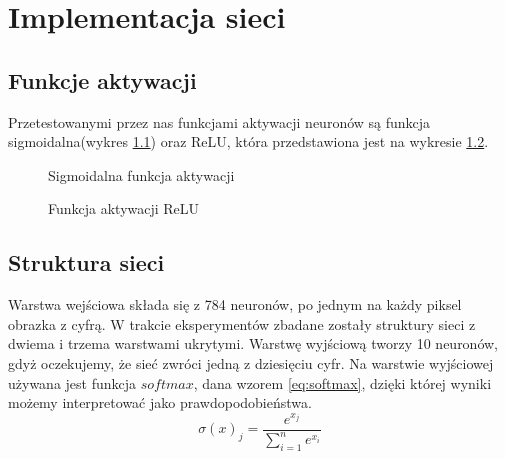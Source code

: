 {\let\clearpage\relax \chapter{Implementacja sieci}}
\section{Funkcje aktywacji}
Przetestowanymi przez nas funkcjami aktywacji neuronów są funkcja sigmoidalna(wykres \ref{fig:sig}) oraz ReLU, która przedstawiona jest na wykresie \ref{fig:relu}.

\begin{figure}
\centering
{}
\caption{Sigmoidalna funkcja aktywacji}
\label{fig:sig}
\end{figure}

\begin{figure}
\centering
{}
\caption{Funkcja aktywacji ReLU}
\label{fig:relu}
\end{figure}

\section{Struktura sieci}
Warstwa wejściowa składa się z 784 neuronów, po jednym na każdy piksel obrazka z cyfrą. W trakcie eksperymentów zbadane zostały struktury sieci z dwiema i trzema warstwami ukrytymi. Warstwę wyjściową tworzy 10 neuronów, gdyż oczekujemy, że sieć zwróci jedną z dziesięciu cyfr. Na warstwie wyjściowej używana jest funkcja $softmax$, dana wzorem \ref{eq:softmax}, dzięki której wyniki możemy interpretować jako prawdopodobieństwa.
\begin{equation}
\sigma(x)_j = \frac{e^{x_j}}{\sum\limits_{i=1}^n e^{x_i}}
\label{eq:softmax}
\end{equation}

